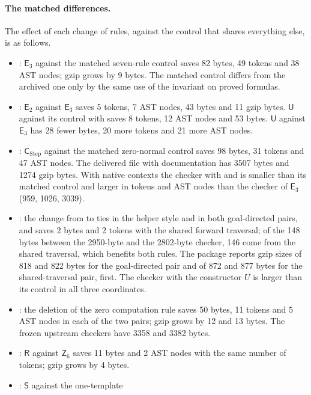 \paragraph{The matched differences.}
The effect of each change of rules, against the control that shares
everything else, is as follows.
\begin{itemize}
\item {}: $\mathsf{E}_3$ against the matched
 seven-rule control saves 82 bytes, 49 tokens and 38 AST nodes; gzip grows
 by 9 bytes. The matched control differs from the archived one only by the
 same use of the invariant on proved formulas.
\item {}: $\mathsf{E}_2$ against
 $\mathsf{E}_3$ saves 5 tokens, 7 AST nodes, 43 bytes and 11 gzip bytes.
 $\mathsf{U}$ against its control with  saves 8 tokens, 12
 AST nodes and 53 bytes. $\mathsf{U}$ against $\mathsf{E}_3$ has 28 fewer
 bytes, 20 more tokens and 21 more AST nodes.
\item {}: $\mathsf{C}_{\mathrm{Step}}$ against the matched
 zero-normal control saves 98 bytes, 31 tokens and 47 AST nodes. The
 delivered file with documentation has 3507 bytes and 1274 gzip bytes. With
 native contexts the checker with  and  is
 smaller than its matched control and larger in tokens and AST nodes than
 the checker of $\mathsf{E}_3$ (959, 1026, 3039).
\item {}: the change from  to
  ties in the helper style and in both goal-directed
 pairs, and saves 2 bytes and 2 tokens with the shared forward traversal;
 of the 148 bytes between the 2950-byte and the 2802-byte checker, 146 come
 from the shared traversal, which benefits both rules. The package reports
 gzip sizes of 818 and 822 bytes for the goal-directed pair and of 872 and
 877 bytes for the shared-traversal pair,  first. The
 checker with the constructor $U$ is larger than its 
 control in all three coordinates.
\item {}: the deletion of the zero computation rule saves
 50 bytes, 11 tokens and 5 AST nodes in each of the two pairs; gzip grows
 by 12 and 13 bytes. The frozen upstream checkers have 3358 and 3382 bytes.
\item {}: $\mathsf{R}$ against $\mathsf{Z}_6$ saves 11
 bytes and 2 AST nodes with the same number of tokens; gzip grows by 4
 bytes.
\item {}: $\mathsf{S}$ against the one-template

\end{itemize}
